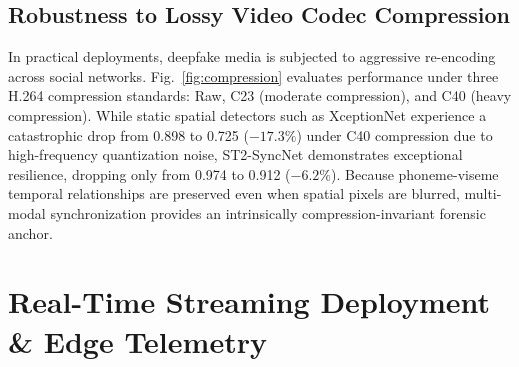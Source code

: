 \documentclass[journal]{IEEEtran}
\begin{document}
\subsection{Robustness to Lossy Video Codec Compression}
In practical deployments, deepfake media is subjected to aggressive re-encoding across social networks. Fig.~\ref{fig:compression} evaluates performance under three H.264 compression standards: Raw, C23 (moderate compression), and C40 (heavy compression). While static spatial detectors such as XceptionNet experience a catastrophic drop from 0.898 to 0.725 ($-17.3\%$) under C40 compression due to high-frequency quantization noise, ST2-SyncNet demonstrates exceptional resilience, dropping only from 0.974 to 0.912 ($-6.2\%$). Because phoneme-viseme temporal relationships are preserved even when spatial pixels are blurred, multi-modal synchronization provides an intrinsically compression-invariant forensic anchor.

\begin{table}[!t]
\caption{Cross-Codec Generalization Under Multiple Compression Standards}
\label{tab:codec_matrix}
\centering
{}
\end{table}

\section{Real-Time Streaming Deployment \& Edge Telemetry}
\end{document}

